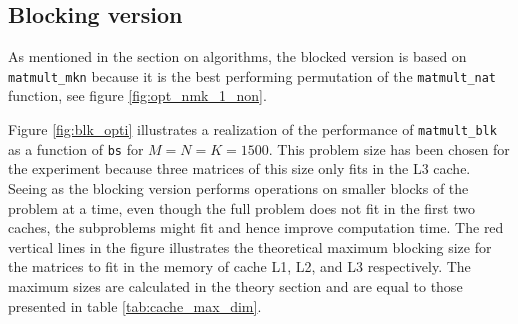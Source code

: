 
















\newpage
\subsection{Blocking version}
As mentioned in the section on algorithms, the blocked version is based on \texttt{matmult\_mkn} because it is the best performing permutation of the \texttt{matmult\_nat} function, see figure \ref{fig:opt_nmk_1_non}. 

Figure \ref{fig:blk_opti} illustrates a realization of the performance of \texttt{matmult\_blk} as a function of \texttt{bs} for $M=N=K=1500$. This problem size has been chosen for the experiment because three matrices of this size only fits in the L3 cache. Seeing as the blocking version performs operations on smaller blocks of the problem at a time, even though the full problem does not fit in the first two caches, the subproblems might fit and hence improve computation time. The red vertical lines in the figure illustrates the theoretical maximum blocking size for the matrices to fit in the memory of cache L1, L2, and L3 respectively. The maximum sizes are calculated in the theory section and are equal to those presented in table \ref{tab:cache_max_dim}.

